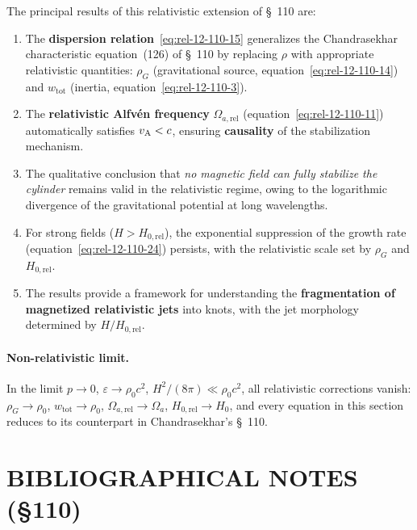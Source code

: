 The principal results of this relativistic extension of \S~110 are:

\begin{enumerate}
\item The \textbf{dispersion relation}~\eqref{eq:rel-12-110-15}
  generalizes the Chandrasekhar characteristic
  equation~(126) of \S~110 by replacing $\rho$ with
  appropriate relativistic quantities: $\rho_{G}$ (gravitational
  source, equation~\eqref{eq:rel-12-110-14}) and $w_{\mathrm{tot}}$
  (inertia, equation~\eqref{eq:rel-12-110-3}).

\item The \textbf{relativistic Alfv\'en frequency}
  $\Omega_{a,\mathrm{rel}}$
  (equation~\eqref{eq:rel-12-110-11}) automatically satisfies
  $v_{\mathrm{A}} < c$, ensuring \textbf{causality} of the stabilization
  mechanism.

\item The qualitative conclusion that \emph{no magnetic field can
  fully stabilize the cylinder} remains valid in the relativistic
  regime, owing to the logarithmic divergence of the gravitational
  potential at long wavelengths.

\item For strong fields ($H > H_{0,\mathrm{rel}}$), the exponential
  suppression of the growth rate
  (equation~\eqref{eq:rel-12-110-24}) persists, with the relativistic
  scale set by $\rho_{G}$ and $H_{0,\mathrm{rel}}$.

\item The results provide a framework for understanding the
  \textbf{fragmentation of magnetized relativistic jets} into knots,
  with the jet morphology determined by $H/H_{0,\mathrm{rel}}$.
\end{enumerate}

\paragraph{Non-relativistic limit.}
In the limit $p \to 0$, $\varepsilon \to \rho_{0}c^{2}$,
$H^{2}/(8\pi) \ll \rho_{0}c^{2}$, all relativistic corrections
vanish: $\rho_{G} \to \rho_{0}$, $w_{\mathrm{tot}} \to \rho_{0}$,
$\Omega_{a,\mathrm{rel}} \to \Omega_{a}$,
$H_{0,\mathrm{rel}} \to H_{0}$, and every equation in this section
reduces to its counterpart in Chandrasekhar's \S~110.

\section*{BIBLIOGRAPHICAL NOTES (\S110)}
\label{sec:rel-12-110-bib}

